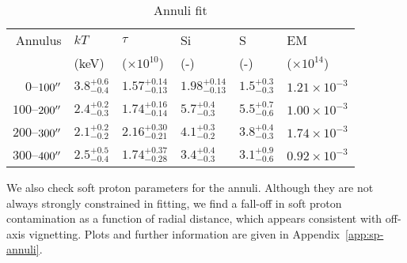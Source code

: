 \documentclass[preprint2,tighten,trackchanges]{aastex6}
\begin{document}
\begin{table}
    \centering
    \caption{Annuli fit \label{tab:annulus-fit}}
    \begin{tabular}{@{}rlllll@{}}
        \toprule
        Annulus & $kT$ & $\tau$ & Si & S & EM \\
         & (keV) & ($\times 10^{10}$) & (-) & (-) & ($\times 10^{14}$)\\
        \midrule
        $0$--$100\mbox{$^{\prime\prime}$}$ & ${3.8}^{+0.6}_{-0.4}$ & ${1.57}^{+0.14}_{-0.13}$ & ${1.98}^{+0.14}_{-0.13}$ & ${1.5}^{+0.3}_{-0.3}$ & $1.21 \times 10^{-3}$ \\
        $100$--$200\mbox{$^{\prime\prime}$}$ & ${2.4}^{+0.2}_{-0.3}$ & ${1.74}^{+0.16}_{-0.14}$ & ${5.7}^{+0.4}_{-0.3}$ & ${5.5}^{+0.7}_{-0.6}$ & $1.00 \times 10^{-3}$ \\
        $200$--$300\mbox{$^{\prime\prime}$}$ & ${2.1}^{+0.2}_{-0.2}$ & ${2.16}^{+0.30}_{-0.21}$ & ${4.1}^{+0.3}_{-0.2}$ & ${3.8}^{+0.4}_{-0.3}$ & $1.74 \times 10^{-3}$ \\
        $300$--$400\mbox{$^{\prime\prime}$}$ & ${2.5}^{+0.5}_{-0.4}$ & ${1.74}^{+0.37}_{-0.28}$ & ${3.4}^{+0.4}_{-0.3}$ & ${3.1}^{+0.9}_{-0.6}$ & $0.92 \times 10^{-3}$ \\
        \bottomrule
    \end{tabular}
\end{table}

\begin{figure*}[]
    \label{fig:annuli-spectra}
\end{figure*}

\begin{figure*}[]
    \label{fig:annuli-delchi}
\end{figure*}


We also check soft proton parameters for the annuli.
Although they are not always strongly constrained in fitting, we find a
fall-off in soft proton contamination as a function of radial distance, which
appears consistent with off-axis vignetting.
Plots and further information are given in Appendix~\ref{app:sp-annuli}.
\end{document}
